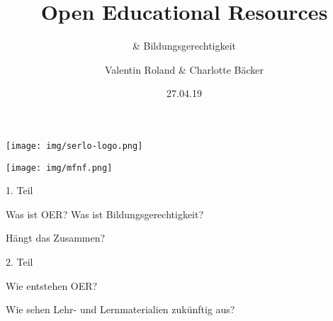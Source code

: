 \documentclass[14pt, usenames, dvipsnames, notes]{beamer}
\title{Open Educational Resources}
\subtitle{\hfill\& Bildungsgerechtigkeit}
\author{Valentin Roland \& Charlotte Bäcker}
\date{27.04.19}
\makeatletter
\def\blfootnote{\gdef\@thefnmark{}\@footnotetext}
\makeatother
\begin{document}
\maketitle

{
    \begin{frame}{}
        \vspace{-.1cm}

        \blfootnote{\vspace{-.7cm}\textcolor{white}{OER Global Logo by Jonathas Mello (CC BY 3.0).}}
    \end{frame}
}

\begin{frame}{}
    \begin{minipage}{.45\textwidth}
        \centering
        \texttt{[image: img/serlo-logo.png]}
    \end{minipage}
    \hfill
    \begin{minipage}{.45\textwidth}
        \centering
        \texttt{[image: img/mfnf.png]}
    \end{minipage}
\end{frame}


\begin{frame}{1. Teil}
    \begin{center}
        {\Large Was ist OER? Was ist Bildungsgerechtigkeit?}

        \medskip

        {\Large Hängt das Zusammen?}
    \end{center}
\end{frame}

\begin{frame}{2. Teil}
    \begin{center}
        {\Large Wie entstehen OER? }

        \medskip

        {\Large Wie sehen Lehr- und Lernmaterialien zukünftig aus?}
    \end{center}
\end{frame}


\end{document}
